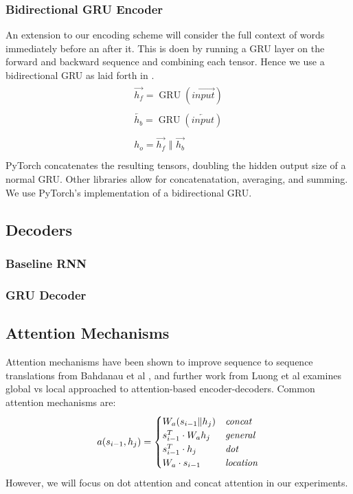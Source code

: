 \documentclass[twoside,twocolumn]{article}
\begin{document}
\subsubsection{Bidirectional GRU Encoder}
An extension to our encoding scheme will consider the full context of words
immediately before an after it. This is doen by running a GRU layer on the
forward and backward sequence and combining each tensor. Hence we use a
bidirectional GRU as laid forth in \cite{bahdanau2014neural}.
\begin{equation}
  \label{eq:bidirectional}
  \begin{split}
    \begin{array}{ll}
      \overrightarrow{h_f} = \operatorname{GRU}(\overrightarrow{input})\\
      \\
      \overleftarrow{h_b} = \operatorname{GRU}(\overleftarrow{input})\\
      \\
      h_o = \overrightarrow{h_f} \,\,\Vert \,\, \overrightarrow{h_b}\\
    \end{array}
  \end{split}
\end{equation}
PyTorch concatenates the resulting tensors, doubling the hidden output size
of a normal GRU. Other libraries allow for concatenatation, averaging,
and summing. We use PyTorch's implementation of a bidirectional GRU.

\subsection{Decoders}
\subsubsection{Baseline RNN}
\subsubsection{GRU Decoder}

\subsection{Attention Mechanisms}
Attention mechanisms have been shown to improve sequence to sequence
translations from Bahdanau et al \cite{bahdanau2014neural}, and further work
from Luong et al \cite{luong2015effective} examines global vs local approached
to attention-based encoder-decoders. Common attention mechanisms are:
\begin{equation}
    a(s_{i-1}, h_j) =
    \begin{cases}
        W_a (s_{i-1} \| h_j) & \text{\emph{concat}} \\
        s_{i-1}^T \cdot W_a h_j & \text{\emph{general}} \\
        s_{i-1}^T \cdot h_j & \text{\emph{dot}} \\
        W_a \cdot s_{i-1} & \text{\emph{location}}
    \end{cases}
\end{equation}
However, we will focus on dot attention and concat attention in our
experiments.
\end{document}

